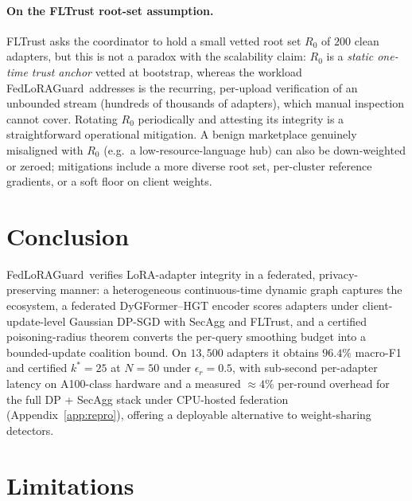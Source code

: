 \documentclass[11pt]{article}
\theoremstyle{plain}
\theoremstyle{definition}
\theoremstyle{remark}
\newcommand{\modelname}{FedLoRAGuard}
\begin{document}
\paragraph{On the FLTrust root-set assumption.}
FLTrust asks the coordinator to hold a small vetted root set
$R_0$ of $200$ clean adapters, but this is not a paradox with the
scalability claim: $R_0$ is a \emph{static one-time trust anchor}
vetted at bootstrap, whereas the workload \modelname\ addresses is
the recurring, per-upload verification of an unbounded stream
(hundreds of thousands of adapters), which manual inspection
cannot cover. Rotating $R_0$ periodically and attesting its
integrity is a straightforward operational mitigation. A benign
marketplace genuinely misaligned with $R_0$ (e.g.\ a
low-resource-language hub) can also be down-weighted or zeroed;
mitigations include a more diverse root set, per-cluster
reference gradients, or a soft floor on client weights.

\section{Conclusion}
\label{sec:conclusion}

\modelname\ verifies LoRA-adapter integrity in a federated,
privacy-preserving manner: a heterogeneous continuous-time
dynamic graph captures the ecosystem, a federated DyGFormer--HGT
encoder scores adapters under client-update-level Gaussian DP-SGD
with SecAgg and FLTrust, and a certified poisoning-radius theorem
converts the per-query smoothing budget into a bounded-update
coalition bound. On $13{,}500$ adapters it obtains $96.4\%$
macro-F1 and certified $k^*\!=\!25$ at $N\!=\!50$ under
$\epsilon_r\!=\!0.5$, with sub-second per-adapter latency on
A100-class hardware and a measured ${\approx}4\%$ per-round
overhead for the full DP + SecAgg stack under CPU-hosted
federation (Appendix~\ref{app:repro}), offering a deployable
alternative to weight-sharing detectors.

\section*{Limitations}
\label{sec:limitations}
\end{document}
